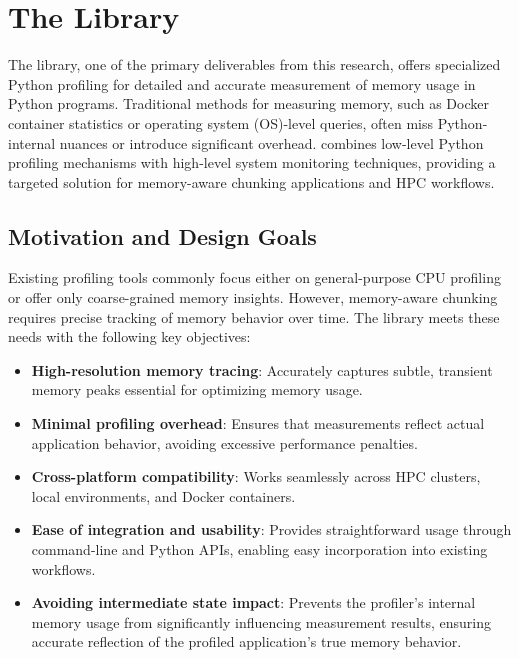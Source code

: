 \section{The \traceq Library}
\label{sec:mmc-traceq}

The \traceq library, one of the primary deliverables from this research, offers specialized Python profiling for detailed and accurate measurement of memory usage in Python programs.
Traditional methods for measuring memory, such as Docker container statistics or operating system (\ac{OS})-level queries, often miss Python-internal nuances or introduce significant overhead.
\traceq combines low-level Python profiling mechanisms with high-level system monitoring techniques, providing a targeted solution for memory-aware chunking applications and \ac{HPC} workflows.

\subsection{Motivation and Design Goals}
\label{sec:mmc-traceq-motivation}

Existing profiling tools commonly focus either on general-purpose \ac{CPU} profiling or offer only coarse-grained memory insights.
However, memory-aware chunking requires precise tracking of memory behavior over time.
The \traceq library meets these needs with the following key objectives:

\begin{itemize}
    \item \textbf{High-resolution memory tracing}: Accurately captures subtle, transient memory peaks essential for optimizing memory usage.
    \item \textbf{Minimal profiling overhead}: Ensures that measurements reflect actual application behavior, avoiding excessive performance penalties.
    \item \textbf{Cross-platform compatibility}: Works seamlessly across \ac{HPC} clusters, local environments, and Docker containers.
    \item \textbf{Ease of integration and usability}: Provides straightforward usage through command-line and Python \ac{API}s, enabling easy incorporation into existing workflows.
    \item \textbf{Avoiding intermediate state impact}: Prevents the profiler’s internal memory usage from significantly influencing measurement results, ensuring accurate reflection of the profiled application's true memory behavior.
\end{itemize}

